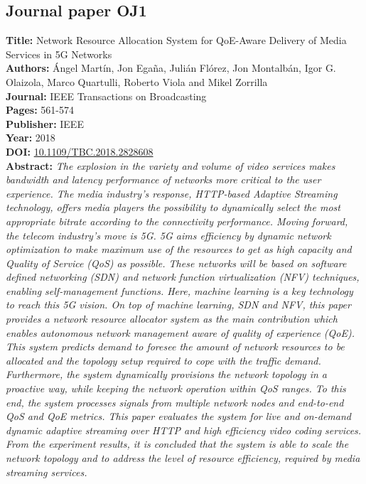 \subsection{Journal paper OJ1}
\label{chap:TBC2018}
\textbf{Title:} Network Resource Allocation System for QoE-Aware Delivery of Media Services in 5G Networks \\
\textbf{Authors:} \'Angel Mart\'in, Jon Egaña, Julián Flórez, Jon Montalbán, Igor G. Olaizola, Marco Quartulli, Roberto Viola and Mikel Zorrilla \\
\textbf{Journal:} IEEE Transactions on Broadcasting \\
\textbf{Pages:} 561-574 \\
\textbf{Publisher:} IEEE \\
\textbf{Year:} 2018 \\
\textbf{DOI:} \url{10.1109/TBC.2018.2828608} \\
\textbf{Abstract:} \textit{The explosion in the variety and volume of video services makes bandwidth and latency performance of networks more critical to the user experience. The media industry's response, HTTP-based Adaptive Streaming technology, offers media players the possibility to dynamically select the most appropriate bitrate according to the connectivity performance. Moving forward, the telecom industry's move is 5G. 5G aims efficiency by dynamic network optimization to make maximum use of the resources to get as high capacity and Quality of Service (QoS) as possible. These networks will be based on software defined networking (SDN) and network function virtualization (NFV) techniques, enabling self-management functions. Here, machine learning is a key technology to reach this 5G vision. On top of machine learning, SDN and NFV, this paper provides a network resource allocator system as the main contribution which enables autonomous network management aware of quality of experience (QoE). This system predicts demand to foresee the amount of network resources to be allocated and the topology setup required to cope with the traffic demand. Furthermore, the system dynamically provisions the network topology in a proactive way, while keeping the network operation within QoS ranges. To this end, the system processes signals from multiple network nodes and end-to-end QoS and QoE metrics. This paper evaluates the system for live and on-demand dynamic adaptive streaming over HTTP and high efficiency video coding services. From the experiment results, it is concluded that the system is able to scale the network topology and to address the level of resource efficiency, required by media streaming services.} \\
\hrulefill


